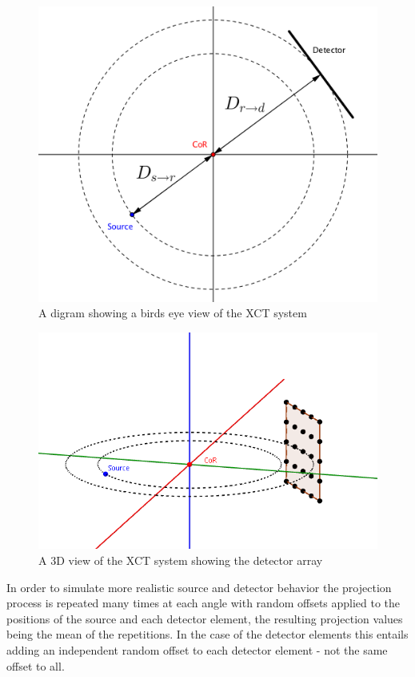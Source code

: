 \documentclass[
  twoside,
  11pt, a4paper,
  footinclude=true,
  headinclude=true,
  cleardoublepage=empty
]{scrbook}
\begin{document}
\begin{figure}[h!]
  \centering
    \includegraphics[width=\textwidth]{figures/XCTsystem.png}
    \caption{A digram showing a birds eye view of the XCT system}
    \label{xctsystem}
\end{figure}

\begin{figure}[h!]
  \centering
    \includegraphics[width=\textwidth]{figures/3dxctsystem.png}
    \caption{A 3D view of the XCT system showing the detector array}
    \label{3dxctsystem}
\end{figure}

In order to simulate more realistic source and detector behavior the projection process is repeated many times at each angle with random offsets applied to the positions of the source and each detector element, the resulting projection values being the mean of the repetitions. In the case of the detector elements this entails adding an independent random offset to each detector element - not the same offset to all.
\end{document}
